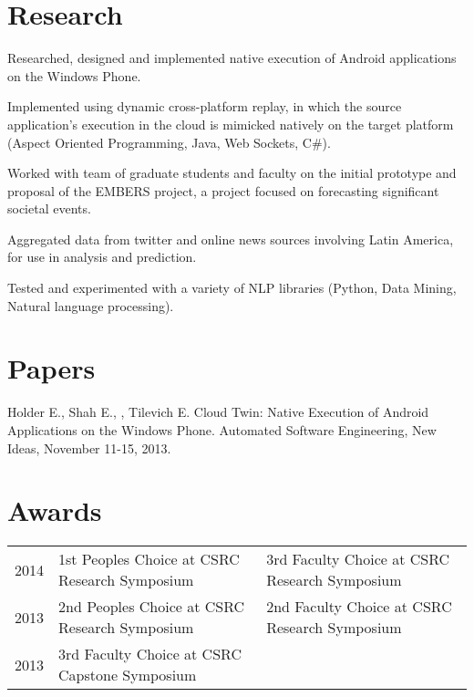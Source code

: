 \documentclass[]{mdavoodi-resume-openfont}
\begin{document}
\section{Research}
\begin{tightemize}
\item Researched, designed and implemented native execution of Android applications on the Windows Phone.
\item Implemented using dynamic cross-platform replay, in which the source application’s execution in the cloud is mimicked natively on the target platform (Aspect Oriented Programming, Java, Web Sockets, C\#).
\end{tightemize}
\sectionsep

\begin{tightemize}
\item Worked with team of graduate students and faculty on the initial prototype and proposal of the EMBERS project, a project focused on forecasting significant societal events.
\item Aggregated data from twitter and online news sources involving Latin America, for use in analysis and prediction. 
\item Tested and experimented with a variety of NLP libraries  (Python, Data Mining, Natural language processing).
\end{tightemize}


\section{Papers} 
Holder E., Shah E., , Tilevich E. Cloud Twin: Native Execution of Android Applications
on the Windows Phone. Automated Software Engineering, New Ideas, November 11-15, 2013.


\section{Awards} 
\begin{tabular}{l|l|l}
2014	     & 1st Peoples Choice at CSRC Research Symposium & 3rd Faculty Choice at CSRC Research Symposium \\
2013	     & 2nd Peoples Choice at CSRC Research Symposium & 2nd Faculty Choice at CSRC Research Symposium \\
2013	     & 3rd Faculty Choice at CSRC Capstone Symposium \\
\end{tabular}
\end{document}
